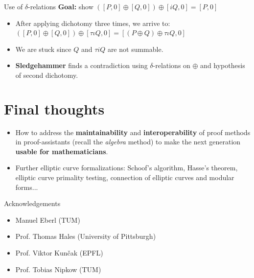 \documentclass[10pt]{beamer}
\begin{document}
\begin{frame}{Use of $\delta$-relations}
\textbf{Goal:} show $([P, 0] \oplus [Q, 0]) \oplus [iQ, 0] = [P, 0]$
\vspace{0.5cm}
\begin{itemize}
	\setlength\itemsep{2em}
	\item After applying dichotomy three times, we arrive to: $
	([P,0] \oplus [Q,0]) \oplus [\tau \iota Q,0] =
	[(P \oplus Q) \oplus \tau \iota Q,0]
	$
	\item We are stuck since $Q$ and $\tau i Q$ are not summable. 
	\item \textbf{Sledgehammer} finds a contradiction using $\delta$-relations on $\oplus$ and hypothesis of second dichotomy.
\end{itemize}
\end{frame}

\section{Final thoughts}

\begin{frame}
\begin{itemize}
	\setlength\itemsep{2em}
	\item How to address the \textbf{maintainability} and \textbf{interoperability} of proof methods in proof-assistants (recall the \textit{algebra} method) to make the next generation \textbf{usable for mathematicians}. 
	\item Further elliptic curve formalizations: Schoof's algorithm, Hasse's theorem, elliptic curve primality testing, connection of elliptic curves and modular forms...
\end{itemize}
\end{frame}

\begin{frame}{Acknowledgements}
\begin{itemize}
	\setlength\itemsep{2em}
	\item Manuel Eberl (TUM)
	\item Prof. Thomas Hales (University of Pittsburgh)
	\item Prof. Viktor Kun\v{c}ak (EPFL)	
	\item Prof. Tobias Nipkow (TUM)
\end{itemize}
\end{frame}
\end{document}
